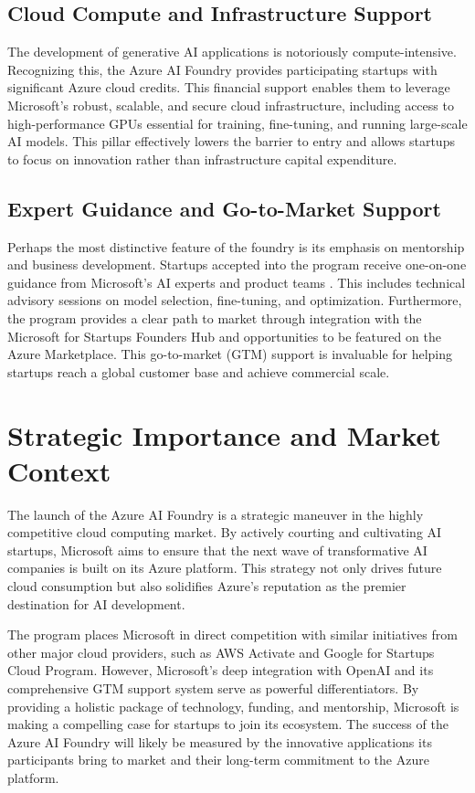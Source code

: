 \documentclass[11pt, a4paper]{article}
\begin{document}
\subsection{Cloud Compute and Infrastructure Support}
The development of generative AI applications is notoriously compute-intensive. Recognizing this, the Azure AI Foundry provides participating startups with significant Azure cloud credits. This financial support enables them to leverage Microsoft's robust, scalable, and secure cloud infrastructure, including access to high-performance GPUs essential for training, fine-tuning, and running large-scale AI models. This pillar effectively lowers the barrier to entry and allows startups to focus on innovation rather than infrastructure capital expenditure.

\subsection{Expert Guidance and Go-to-Market Support}
Perhaps the most distinctive feature of the foundry is its emphasis on mentorship and business development. Startups accepted into the program receive one-on-one guidance from Microsoft's AI experts and product teams \cite{venturebeat}. This includes technical advisory sessions on model selection, fine-tuning, and optimization. Furthermore, the program provides a clear path to market through integration with the Microsoft for Startups Founders Hub and opportunities to be featured on the Azure Marketplace. This go-to-market (GTM) support is invaluable for helping startups reach a global customer base and achieve commercial scale.

\section{Strategic Importance and Market Context}
The launch of the Azure AI Foundry is a strategic maneuver in the highly competitive cloud computing market. By actively courting and cultivating AI startups, Microsoft aims to ensure that the next wave of transformative AI companies is built on its Azure platform. This strategy not only drives future cloud consumption but also solidifies Azure's reputation as the premier destination for AI development.

The program places Microsoft in direct competition with similar initiatives from other major cloud providers, such as AWS Activate and Google for Startups Cloud Program. However, Microsoft's deep integration with OpenAI and its comprehensive GTM support system serve as powerful differentiators. By providing a holistic package of technology, funding, and mentorship, Microsoft is making a compelling case for startups to join its ecosystem. The success of the Azure AI Foundry will likely be measured by the innovative applications its participants bring to market and their long-term commitment to the Azure platform.
\end{document}
